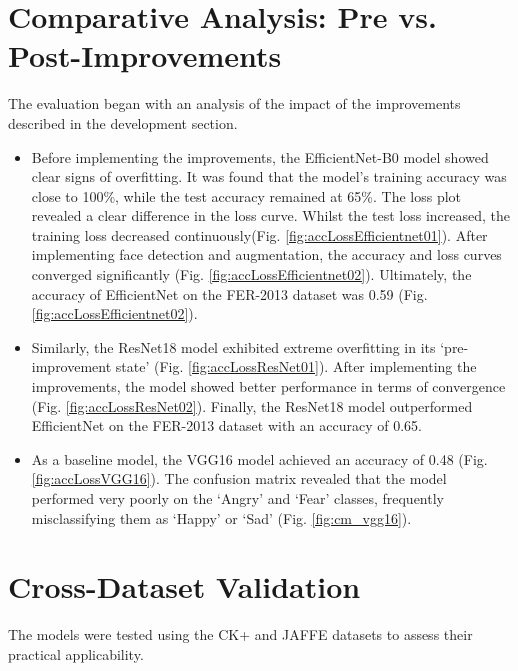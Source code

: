 \section{Comparative Analysis: Pre vs. Post-Improvements}

The evaluation began with an analysis of the impact of the improvements described in the development section.

\begin{itemize}
	\item Before implementing the improvements, the EfficientNet-B0 model showed clear signs of overfitting. It was found that the model’s training accuracy was close to 100\%, while the test accuracy remained at 65\%. The loss plot revealed a clear difference in the loss curve. Whilst the test loss increased, the training loss decreased continuously(Fig. \ref{fig:accLossEfficientnet01}). After implementing face detection and augmentation, the accuracy and loss curves converged significantly (Fig. \ref{fig:accLossEfficientnet02}). Ultimately, the accuracy of EfficientNet on the FER-2013 dataset was 0.59 (Fig. \ref{fig:accLossEfficientnet02}).
	\item Similarly, the ResNet18 model exhibited extreme overfitting in its ‘pre-improvement state’ (Fig. \ref{fig:accLossResNet01}). After implementing the improvements, the model showed better performance in terms of convergence (Fig. \ref{fig:accLossResNet02}). Finally, the ResNet18 model outperformed EfficientNet on the FER-2013 dataset with an accuracy of 0.65.
	\item As a baseline model, the VGG16 model achieved an accuracy of 0.48 (Fig. \ref{fig:accLossVGG16}). The confusion matrix revealed that the model performed very poorly on the ‘Angry’ and ‘Fear’ classes, frequently misclassifying them as ‘Happy’ or ‘Sad’ (Fig. \ref{fig:cm_vgg16}).
\end{itemize}

\section{Cross-Dataset Validation}

The models were tested using the CK+ and JAFFE datasets to assess their practical applicability.

